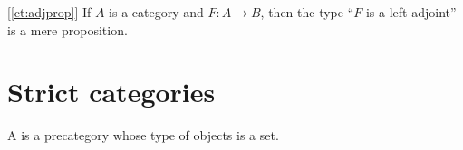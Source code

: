 \documentclass[hott-all.tex]{subfiles}
\begin{document}
%

\begin{cor}[\cref{ct:adjprop}]
  If $A$ is a category and $F:A\to B$, then the type ``$F$ is a left adjoint'' is a mere proposition.
\end{cor}


\section{Strict categories}


\begin{defn}
  A 
  is a precategory whose type of objects is a set.
\end{defn}

%
\end{document}
